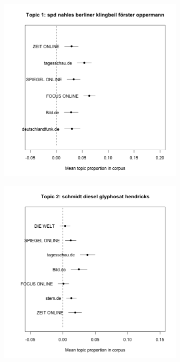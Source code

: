 \documentclass[12pt,a4paper,notitlepage]{article}
\begin{document}
\begin{figure}[H]
	\caption{Mean prevalence of topics within each news source corpus 1}
	\begin{center}
		\begin{subfigure}[normla]{0.2\textwidth}
			\includegraphics[width=\textwidth]{../figs/estimate_effect1.png}
		\end{subfigure}
		\begin{subfigure}[normla]{0.2\textwidth}
			\includegraphics[width=\textwidth]{../figs/estimate_effect2.png}

\end{subfigure}
\end{center}
\end{figure}
\end{document}
